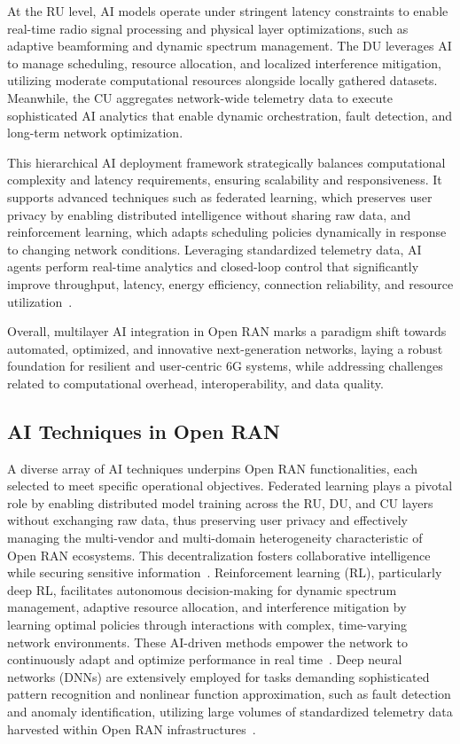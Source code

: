 \documentclass[sigconf]{acmart}
\begin{document}
At the RU level, AI models operate under stringent latency constraints to enable real-time radio signal processing and physical layer optimizations, such as adaptive beamforming and dynamic spectrum management. The DU leverages AI to manage scheduling, resource allocation, and localized interference mitigation, utilizing moderate computational resources alongside locally gathered datasets. Meanwhile, the CU aggregates network-wide telemetry data to execute sophisticated AI analytics that enable dynamic orchestration, fault detection, and long-term network optimization. 

This hierarchical AI deployment framework strategically balances computational complexity and latency requirements, ensuring scalability and responsiveness. It supports advanced techniques such as federated learning, which preserves user privacy by enabling distributed intelligence without sharing raw data, and reinforcement learning, which adapts scheduling policies dynamically in response to changing network conditions. Leveraging standardized telemetry data, AI agents perform real-time analytics and closed-loop control that significantly improve throughput, latency, energy efficiency, connection reliability, and resource utilization~\cite{ref54}. 

Overall, multilayer AI integration in Open RAN marks a paradigm shift towards automated, optimized, and innovative next-generation networks, laying a robust foundation for resilient and user-centric 6G systems, while addressing challenges related to computational overhead, interoperability, and data quality.

\subsection{AI Techniques in Open RAN}

A diverse array of AI techniques underpins Open RAN functionalities, each selected to meet specific operational objectives. Federated learning plays a pivotal role by enabling distributed model training across the RU, DU, and CU layers without exchanging raw data, thus preserving user privacy and effectively managing the multi-vendor and multi-domain heterogeneity characteristic of Open RAN ecosystems. This decentralization fosters collaborative intelligence while securing sensitive information~\cite{ref54}. Reinforcement learning (RL), particularly deep RL, facilitates autonomous decision-making for dynamic spectrum management, adaptive resource allocation, and interference mitigation by learning optimal policies through interactions with complex, time-varying network environments. These AI-driven methods empower the network to continuously adapt and optimize performance in real time~\cite{ref21,ref22}. Deep neural networks (DNNs) are extensively employed for tasks demanding sophisticated pattern recognition and nonlinear function approximation, such as fault detection and anomaly identification, utilizing large volumes of standardized telemetry data harvested within Open RAN infrastructures~\cite{ref23,ref24}.
\end{document}
